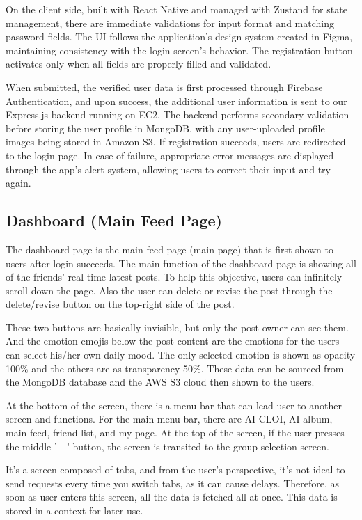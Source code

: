 \documentclass[conference]{IEEEtran}
\begin{document}
        On the client side, built with React Native and managed with Zustand for state management, there are immediate validations for input format and matching password fields. The UI follows the application's design system created in Figma, maintaining consistency with the login screen's behavior. The registration button activates only when all fields are properly filled and validated.

        When submitted, the verified user data is first processed through Firebase Authentication, and upon success, the additional user information is sent to our Express.js backend running on EC2. The backend performs secondary validation before storing the user profile in MongoDB, with any user-uploaded profile images being stored in Amazon S3. If registration succeeds, users are redirected to the login page. In case of failure, appropriate error messages are displayed through the app's alert system, allowing users to correct their input and try again.

    \subsection{Dashboard (Main Feed Page)}
        The dashboard page is the main feed page (main page) that is first shown to users after login succeeds. The main function of the dashboard page is showing all of the friends' real-time latest posts. To help this objective, users can infinitely scroll down the page. Also the user can delete or revise the post through the delete/revise button on the top-right side of the post.

        These two buttons are basically invisible, but only the post owner can see them. And the emotion emojis below the post content are the emotions for the users can select his/her own daily mood. The only selected emotion is shown as opacity 100\% and the others are as transparency 50\%. These data can be sourced from the MongoDB database and the AWS S3 cloud then shown to the users.

        At the bottom of the screen, there is a menu bar that can lead user to another screen and functions. For the main menu bar, there are AI-CLOI, AI-album, main feed, friend list, and my page. At the top of the screen, if the user presses the middle '—' button, the screen is transited to the group selection screen.

        It's a screen composed of tabs, and from the user's perspective, it's not ideal to send requests every time you switch tabs, as it can cause delays. Therefore, as soon as user enters this screen, all the data is fetched all at once. This data is stored in a context for later use.
\end{document}

